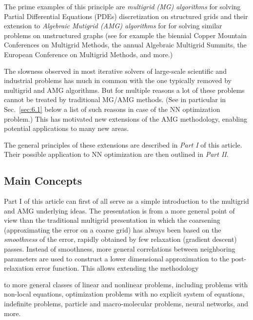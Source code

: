 \documentclass{article} %
\begin{document}
The prime examples of this principle are {\it multigrid (MG) algorithms} for solving Partial Differential Equations (PDEs) discretization on structured grids \cite{?} and their extension to {\it Algebraic Mutigrid (AMG) algorithms} for for solving similar problems on unstructured graphs (see for example the biennial Copper Mountain Conferences on Multigrid Methods, the annual Algebraic Multigrid Summits, the European Conference on Multigrid Methods, and more.)

The slowness observed in most iterative solvers of large-scale scientific and industrial problems has much in common with the one typically removed by multigrid and AMG algorithms. But for multiple reasons a lot of these problems cannot be treated by traditional MG/AMG methods. (See in particular in Sec.~\ref{sec:6.1} below a list of such reasons in case of the NN optimization problem.) This has motivated new extensions of the AMG methodology, enabling potential applications to many new areas.

The general principles of these extensions are described in {\it Part I} of this article. Their possible application to NN optimization are then outlined in {\it Part II}.

\subsection{Main Concepts}
Part I of this article can first of all serve as a simple introduction to the multigrid and AMG underlying ideas. The presentation is from a more general point of view than the traditional multigrid presentation in which the coarsening (approximating the error on a coarse grid) has always been based on the {\it smoothness} of the error, rapidly obtained by few relaxation (gradient descent) passes. Instead of smoothness, more general correlations between neighboring parameters are used to construct a lower dimensional approximation to the post-relaxation error function. This allows extending the methodology

to more general classes of linear and nonlinear problems, including problems with non-local equations, optimization problems with no explicit system of equations, indefinite problems, particle and macro-molecular problems, neural networks, and more.
\end{document}
